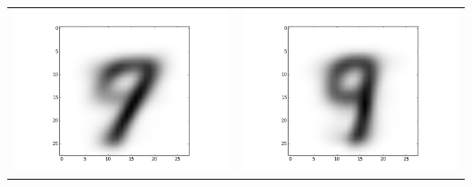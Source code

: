 \documentclass[11pt]{article}
\begin{document}
\begin{tabular}{cc}
\includegraphics[scale=0.4]{images/10-images/6} & \includegraphics[scale=0.4]{images/10-images/7} \\

\end{tabular}
\end{document}
